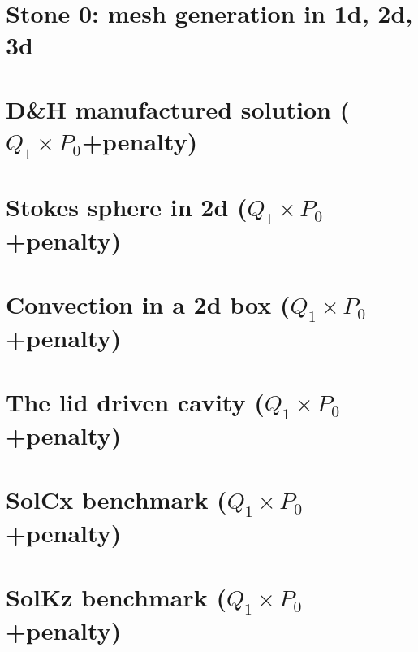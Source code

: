 \documentclass[a4paper,11pt]{report}
\begin{document}





\chapter*{Stone 0: mesh generation in 1d, 2d, 3d \label{f00}} %

\chapter{D\&H manufactured solution ($Q_1\times P_0$+penalty)\label{f01}} %

\chapter{Stokes sphere in 2d ($Q_1\times P_0$+penalty) \label{f02}} %

\chapter{Convection in a 2d box ($Q_1\times P_0$+penalty)\label{f03}} %

\chapter{The lid driven cavity ($Q_1\times P_0$+penalty) \label{f04}} %

\chapter{SolCx benchmark ($Q_1\times P_0$+penalty)\label{f05}} %

\chapter{SolKz benchmark ($Q_1\times P_0$+penalty)\label{f06}} %
\end{document}
